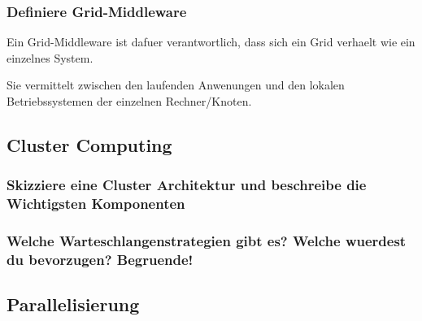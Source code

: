 \subsubsection{Definiere Grid-Middleware}
	Ein Grid-Middleware ist dafuer verantwortlich,
	dass sich ein Grid verhaelt wie ein einzelnes System.
	
	Sie vermittelt zwischen den laufenden Anwenungen und den lokalen
	Betriebssystemen der einzelnen Rechner/Knoten.
	
\subsection{Cluster Computing}
	\subsubsection{Skizziere eine Cluster Architektur und beschreibe die
	Wichtigsten Komponenten}
	\subsubsection{Welche Warteschlangenstrategien gibt es? Welche wuerdest du
	bevorzugen? Begruende!}
	
\subsection{Parallelisierung}